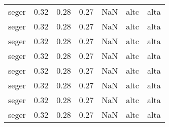 \begin{tabular}{lrrrrll}
     seger &     0.32 &     0.28 &     0.27 &      NaN &      altc &     alta \\
     seger &     0.32 &     0.28 &     0.27 &      NaN &      altc &     alta \\
     seger &     0.32 &     0.28 &     0.27 &      NaN &      altc &     alta \\
     seger &     0.32 &     0.28 &     0.27 &      NaN &      altc &     alta \\
     seger &     0.32 &     0.28 &     0.27 &      NaN &      altc &     alta \\
     seger &     0.32 &     0.28 &     0.27 &      NaN &      altc &     alta \\
     seger &     0.32 &     0.28 &     0.27 &      NaN &      altc &     alta \\
     seger &     0.32 &     0.28 &     0.27 &      NaN &      altc &     alta \\
\bottomrule
\end{tabular}
